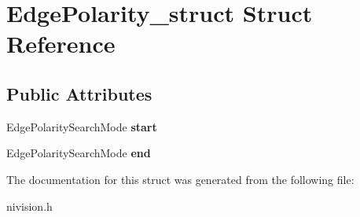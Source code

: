 \hypertarget{structEdgePolarity__struct}{
\section{EdgePolarity\_\-struct Struct Reference}
\label{structEdgePolarity__struct}
}
\subsection*{Public Attributes}
\begin{DoxyCompactItemize}
\item 
\hypertarget{structEdgePolarity__struct_adf28db9d373ad0ef4c45e27c723444ad}{
EdgePolaritySearchMode {\bfseries start}}
\label{structEdgePolarity__struct_adf28db9d373ad0ef4c45e27c723444ad}

\item 
\hypertarget{structEdgePolarity__struct_aa0fe4708dad49e6b1ebe319f66ef5641}{
EdgePolaritySearchMode {\bfseries end}}
\label{structEdgePolarity__struct_aa0fe4708dad49e6b1ebe319f66ef5641}

\end{DoxyCompactItemize}


The documentation for this struct was generated from the following file:\begin{DoxyCompactItemize}
\item 
nivision.h\end{DoxyCompactItemize}
